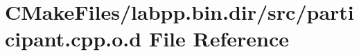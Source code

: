\hypertarget{CMakeFiles_2labpp_8bin_8dir_2src_2participant_8cpp_8o_8d}{}\section{C\+Make\+Files/labpp.bin.\+dir/src/participant.cpp.\+o.\+d File Reference}
\label{CMakeFiles_2labpp_8bin_8dir_2src_2participant_8cpp_8o_8d}
